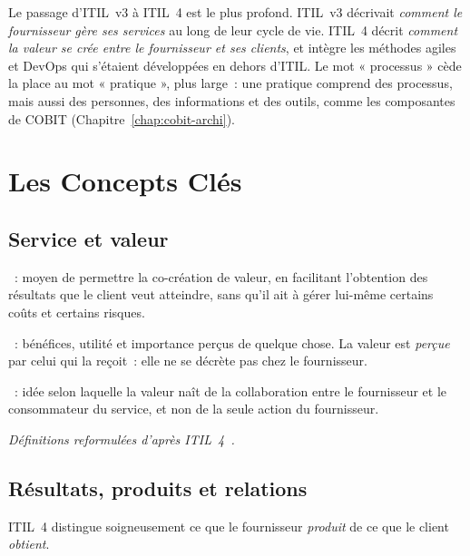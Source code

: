 Le passage d'ITIL~v3 à ITIL~4 est le plus profond. ITIL~v3 décrivait
\emph{comment le fournisseur gère ses services} au long de leur cycle de
vie. ITIL~4 décrit \emph{comment la valeur se crée entre le fournisseur et
ses clients}, et intègre les méthodes agiles et DevOps qui s'étaient
développées en dehors d'ITIL. Le mot « processus » cède la place au mot
« pratique », plus large~: une pratique comprend des processus, mais aussi
des personnes, des informations et des outils, comme les composantes de
COBIT (Chapitre~\ref{chap:cobit-archi}).

\section{Les Concepts Clés}
\label{sec:c12-concepts}

\subsection{Service et valeur}

\begin{boxdef}
~: moyen de permettre la
co-création de valeur, en facilitant l'obtention des résultats que le
client veut atteindre, sans qu'il ait à gérer lui-même certains coûts et
certains risques.

\medskip
{}~: bénéfices, utilité et importance
perçus de quelque chose. La valeur est \emph{perçue} par celui qui la
reçoit~: elle ne se décrète pas chez le fournisseur.

\medskip
{}~: idée selon
laquelle la valeur naît de la collaboration entre le fournisseur et le
consommateur du service, et non de la seule action du fournisseur.
\end{boxdef}
{\small\itshape Définitions reformulées d'après ITIL~4~\cite{axelos2019itil4}.}

\subsection{Résultats, produits et relations}

ITIL~4 distingue soigneusement ce que le fournisseur \emph{produit} de ce
que le client \emph{obtient}.


